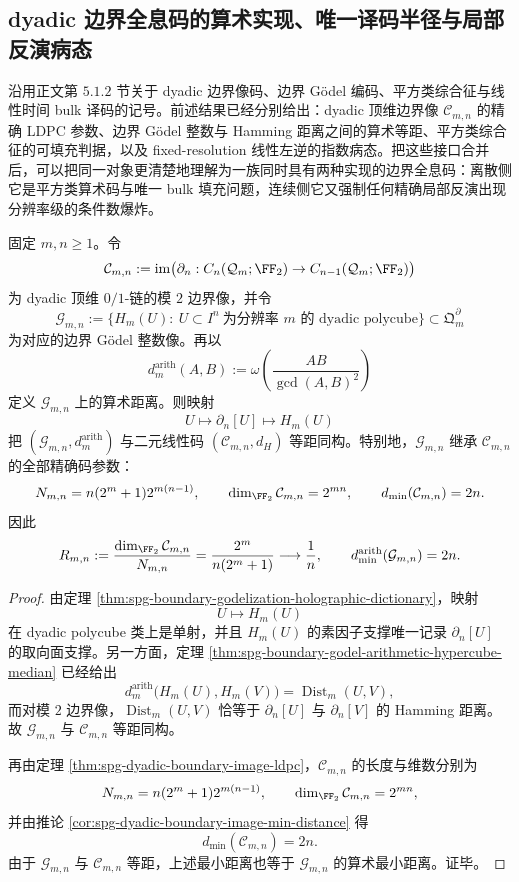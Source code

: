 \subsection{dyadic 边界全息码的算术实现、唯一译码半径与局部反演病态}\label{subsec:conclusion-dyadic-boundary-code-arithmetic-unique-decoding-instability}

沿用正文第 \(5.1.2\) 节关于 dyadic 边界像码、边界 Gödel 编码、平方类综合征与线性时间 bulk 译码的记号。前述结果已经分别给出：dyadic 顶维边界像 \(\mathcal C_{m,n}\) 的精确 LDPC 参数、边界 Gödel 整数与 Hamming 距离之间的算术等距、平方类综合征的可填充判据，以及 fixed-resolution 线性左逆的指数病态。把这些接口合并后，可以把同一对象更清楚地理解为一族同时具有两种实现的边界全息码：离散侧它是平方类算术码与唯一 bulk 填充问题，连续侧它又强制任何精确局部反演出现分辨率级的条件数爆炸。

\begin{theorem}\label{thm:conclusion-dyadic-boundary-code-dual-realization-parameters}
固定 \(m,n\ge 1\)。令
\[
\mathcal C_{m,n}
:=
\operatorname{im}\bigl(\partial_n:C_n(\mathcal Q_m;\FF_2)\to C_{n-1}(\mathcal Q_m;\FF_2)\bigr)
\]
为 dyadic 顶维 \(0/1\)-链的模 \(2\) 边界像，并令
\[
\mathcal G_{m,n}
:=
\{H_m(U):\ U\subset I^n\ \text{为分辨率 }m\text{ 的 dyadic polycube}\}
\subset \mathfrak Q_m^{\partial}
\]
为对应的边界 Gödel 整数像。再以
\[
d_m^{\mathrm{arith}}(A,B)
:=
\omega\!\left(\frac{AB}{\gcd(A,B)^2}\right)
\]
定义 \(\mathcal G_{m,n}\) 上的算术距离。则映射
\[
U\longmapsto \partial_n[U]\longmapsto H_m(U)
\]
把 \((\mathcal G_{m,n},d_m^{\mathrm{arith}})\) 与二元线性码 \((\mathcal C_{m,n},d_H)\) 等距同构。特别地，\(\mathcal G_{m,n}\) 继承 \(\mathcal C_{m,n}\) 的全部精确码参数：
\[
N_{m,n}=n(2^m+1)2^{m(n-1)},
\qquad
\dim_{\FF_2}\mathcal C_{m,n}=2^{mn},
\qquad
d_{\min}(\mathcal C_{m,n})=2n.
\]
因此
\[
R_{m,n}
:=
\frac{\dim_{\FF_2}\mathcal C_{m,n}}{N_{m,n}}
=
\frac{2^m}{n(2^m+1)}
\longrightarrow
\frac1n,
\qquad
d_{\min}^{\mathrm{arith}}(\mathcal G_{m,n})=2n.
\]
\end{theorem}
\begin{proof}
由定理 \ref{thm:spg-boundary-godelization-holographic-dictionary}，映射
\[
U\longmapsto H_m(U)
\]
在 dyadic polycube 类上是单射，并且 \(H_m(U)\) 的素因子支撑唯一记录 \(\partial_n[U]\) 的取向面支撑。另一方面，定理 \ref{thm:spg-boundary-godel-arithmetic-hypercube-median} 已经给出
\[
d_m^{\mathrm{arith}}\bigl(H_m(U),H_m(V)\bigr)
=
\operatorname{Dist}_m(U,V),
\]
而对模 \(2\) 边界像，\(\operatorname{Dist}_m(U,V)\) 恰等于 \(\partial_n[U]\) 与 \(\partial_n[V]\) 的 Hamming 距离。故 \(\mathcal G_{m,n}\) 与 \(\mathcal C_{m,n}\) 等距同构。

再由定理 \ref{thm:spg-dyadic-boundary-image-ldpc}，\(\mathcal C_{m,n}\) 的长度与维数分别为
\[
N_{m,n}=n(2^m+1)2^{m(n-1)},
\qquad
\dim_{\FF_2}\mathcal C_{m,n}=2^{mn},
\]
并由推论 \ref{cor:spg-dyadic-boundary-image-min-distance} 得
\[
d_{\min}(\mathcal C_{m,n})=2n.
\]
由于 \(\mathcal G_{m,n}\) 与 \(\mathcal C_{m,n}\) 等距，上述最小距离也等于 \(\mathcal G_{m,n}\) 的算术最小距离。证毕。
\end{proof}

